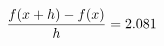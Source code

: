 \documentclass[preview]{standalone}
\begin{document}
\begin{align*}
\special{dvisvgm:raw <g id='unique000'>}\frac{f(x+h)-f(x)}{h} = 2.081\special{dvisvgm:raw </g>}
\end{align*}
\end{document}
